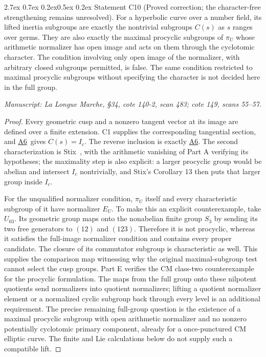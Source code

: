 \documentclass[11pt,a4paper]{article}
\makeatletter
\newcommand{\passage}[1]{\par\smallskip\noindent\textit{Manuscript: #1}\par\smallskip}
\newcommand{\resref}[1]{\hyperref[res:#1]{#1}}
\newcommand{\Rtwo}{\resref{A6}}
\renewcommand\paragraph{\@startsection{paragraph}{4}{\z@}%
  {2.7ex \@plus 0.7ex \@minus 0.2ex}{0.5ex \@plus 0.2ex}%
  {\normalfont\normalsize\bfseries}}
\makeatother
\begin{document}
\paragraph{Statement C10 (Proved correction; the character-free strengthening remains unresolved).}\label{res:C10}
For a hyperbolic curve over a number field, its lifted inertia subgroups are exactly the nontrivial subgroups $C(s)$ as $s$ ranges over germs. They are also exactly the maximal procyclic subgroups of $\pi_U$ whose arithmetic normalizer has open image and acts on them through the cyclotomic character. The condition involving only open image of the normalizer, with arbitrary closed subgroups permitted, is false. The same condition restricted to maximal procyclic subgroups without specifying the character is not decided here in the full group.
\passage{La Longue Marche, \S34, cote 140-2, scan 483; cote 149, scans 55--57.}
\begin{proof}
Every geometric cusp and a nonzero tangent vector at its image are defined over a finite extension. C1 supplies the corresponding tangential section, and \Rtwo\ gives $C(s)=I_c$. The reverse inclusion is exactly \Rtwo. The second characterization is Stix~\cite[Theorem 20 and Corollary 21]{Stix2008}, with the arithmetic vanishing of Part A verifying its hypotheses; the maximality step is also explicit: a larger procyclic group would be abelian and intersect $I_c$ nontrivially, and Stix's Corollary 13 then puts that larger group inside $I_c$.

For the unqualified normalizer condition, $\pi_U$ itself and every characteristic subgroup of it have normalizer $E_U$. To make this an explicit counterexample, take $U_{03}$. Its geometric group maps onto the nonabelian finite group $S_3$ by sending its two free generators to $(12)$ and $(123)$. Therefore it is not procyclic, whereas it satisfies the full-image normalizer condition and contains every proper candidate. The closure of its commutator subgroup is characteristic as well. This supplies the comparison map witnessing why the original maximal-subgroup test cannot select the cusp groups. Part E verifies the CM class-two counterexample for the procyclic formulation. The maps from the full group onto these nilpotent quotients send normalizers into quotient normalizers; lifting a quotient normalizer element or a normalized cyclic subgroup back through every level is an additional requirement. The precise remaining full-group question is the existence of a maximal procyclic subgroup with open arithmetic normalizer and no nonzero potentially cyclotomic primary component, already for a once-punctured CM elliptic curve. The finite and Lie calculations below do not supply such a compatible lift.
\end{proof}
\end{document}
